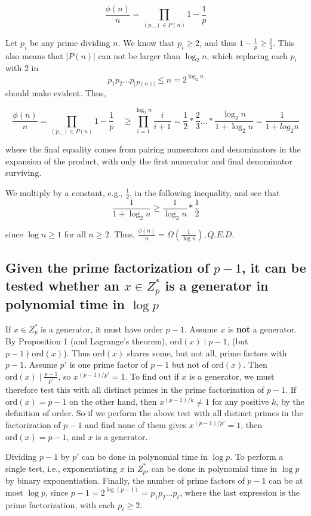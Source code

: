 \documentclass{article}
\newcommand{\z}[1]{Z^*_{#1}}
\newcommand{\ord}{\text{ord}}
\begin{document}
$$ \frac{\phi(n)}{n} = \prod_{(p,\_) \in P(n)}1 - \frac{1}{p}$$

Let $p_i$ be any prime dividing $n$. We know that $p_i \geq 2$, and thus $1
-\frac{1}{p} \geq \frac{1}{2}$. This also means that $|P(n)|$ can not be larger
than $\log_2 n$, which replacing each $p_i$ with 2 in
$$ p_1p_2...p_{|P(n)|} \leq n = 2^{\log_2 n}$$
\noindent should make evident. Thus, 

$$ \frac{\phi(n)}{n} = \prod_{(p,\_) \in P(n)}1 - \frac{1}{p} \quad \geq
\prod_{i=1}^{\log_2 n} \frac{i}{i+1} = \frac{1}{2}*\frac{2}{3} \dots * \frac{\log
  _2 n}{1 + \log_2 n } = \frac{1}{1 + log_2 n} $$

\noindent where the final equality comes from pairing numerators and
denominators in the expansion of the product, with only the first numerator and
final denominator surviving.

We multiply by a constant, e.g., $\frac{1}{2}$, in the following inequality, and
see that $$\frac{1}{1 + \log_2 n} \geq \frac{1}{\log_2 n}* \frac{1}{2} $$

\noindent since $\log n \geq 1$ for all $n \geq 2$. Thus, $\frac{\phi(n)}{n} =
\Omega\left( \frac{1}{\log n} \right), Q.E.D.$


\subsection{Given the prime factorization of $p-1$, it can be tested whether an
  $x \in \z p$ is a generator in polynomial time in $\log p$}

If $x \in \z p$ is a generator, it must have order $p -1$. Assume $x$ is
\textbf{not} a generator. By Proposition 1 (and Lagrange's theorem), $\ord(x)
\mid p - 1$, (but $p-1 \nmid \ord(x)$). Thus $\ord(x)$ shares some, but not all,
prime factors with $p-1$. Assume $p'$ is one prime factor of $p -1$ but not of
$\ord(x)$. Then $\ord(x) \mid \frac{p-1}{p'}$, so $x^{(p-1)/p'} = 1$. To find out
if $x$ is a generator, we must therefore test this with all distinct primes in
the prime factorization of $p-1$. If $\ord(x) = p-1$ on the other hand, then
$x^{(p-1)/k} \not = 1$ for any positive $k$, by the definition of order. So if
we perform the above test with all distinct primes in the factorization of $p-1$
and find none of them gives $x^{(p-1)/p'} = 1$, then $\ord(x) = p-1$, and $x$ is
a generator.

Dividing $p-1$ by $p'$ can be done in polynomial time in $\log p$. To perform a
single test, i.e., exponentiating $x$ in $\z p$, can be done in polynomial time
in $\log p$ by binary exponentiation. Finally, the number of prime factors of
$p-1$ can be at most $\log p$, since $p-1= 2^{\log (p-1)}=p_1p_2...p_\ell$,
where the last expression is the prime factorization, with each $p_i \geq 2$.
\end{document}
